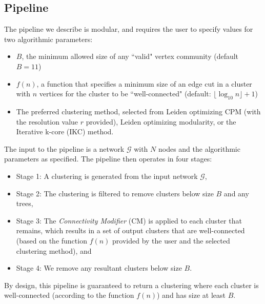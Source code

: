 \documentclass[11pt]{article}   	%
\begin{document}
\subsection{Pipeline}

The pipeline we describe is modular, and requires the user to specify values for two algorithmic parameters:
\begin{itemize}
\item $B$, the minimum allowed size of any ``valid" vertex community (default $B=11$)
\item $f(n)$, a function that specifies a minimum size of an edge cut in a cluster with $n$ vertices  for the cluster to be ``well-connected" (default: $ \lfloor \log_{10} n \rfloor +1$)
\item The preferred clustering method, selected from Leiden optimizing CPM (with the resolution value $r$ provided), Leiden optimizing modularity, or the Iterative k-core (IKC) method.
\end{itemize}

\noindent
The input to the pipeline is a network $\mathcal{G}$ with $N$ nodes and the algorithmic parameters as specified.
The pipeline then operates in four stages:
\begin{itemize}
\item
Stage 1: A clustering is generated  from the input network $\mathcal{G}$,
\item Stage 2: The clustering is filtered  to remove clusters below size $B$  and any trees,
\item Stage 3: The \emph{Connectivity Modifier} (CM) is applied to each cluster that remains, which results in a set of output clusters that are well-connected (based on the function $f(n)$ provided by the user and the selected clustering method), and
\item Stage 4: We remove any resultant clusters below size $B$.
\end{itemize}
By design, this pipeline is guaranteed to return a clustering where each cluster is well-connected (according to the function $f(n)$)  and has size at least $B$.
\end{document}

